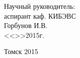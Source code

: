 \vfill

\begin{flushright}
\begin{minipage}{0.45\textwidth}
 \begin{flushleft}
  Научный руководитель: \\
  аспирант каф. КИБЭВС \\
  \underline{\hspace{3cm}}Горбунов И.В. \\
  <<\underline{\hspace{1cm}}>>\underline{\hspace{3cm}}2015г.\\
 \end{flushleft}
\end{minipage}
\end{flushright}

\vfill

\begin{center}
 Томск 2015
\end{center}
